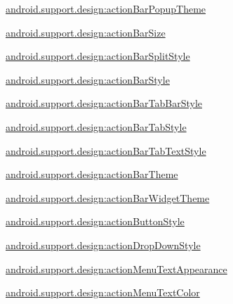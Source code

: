 {\ttfamily \hyperlink{classandroid_1_1support_1_1design_1_1R_1_1styleable_abe6573d781c288c0c9046d1b364bc010}{android.\+support.\+design\+:action\+Bar\+Popup\+Theme}}

{\ttfamily \hyperlink{classandroid_1_1support_1_1design_1_1R_1_1styleable_aa3e26576191105ff3f5ba8a1d92c188f}{android.\+support.\+design\+:action\+Bar\+Size}}

{\ttfamily \hyperlink{classandroid_1_1support_1_1design_1_1R_1_1styleable_a1bb68b5f66ea4a588bc4527379e17f79}{android.\+support.\+design\+:action\+Bar\+Split\+Style}}

{\ttfamily \hyperlink{classandroid_1_1support_1_1design_1_1R_1_1styleable_a762be5b610718b70a3cf442d4599d870}{android.\+support.\+design\+:action\+Bar\+Style}}

{\ttfamily \hyperlink{classandroid_1_1support_1_1design_1_1R_1_1styleable_ab0c563d507ebb2630a4566f31cf6f123}{android.\+support.\+design\+:action\+Bar\+Tab\+Bar\+Style}}

{\ttfamily \hyperlink{classandroid_1_1support_1_1design_1_1R_1_1styleable_a1347569d26ea3874ad7e4895dd851764}{android.\+support.\+design\+:action\+Bar\+Tab\+Style}}

{\ttfamily \hyperlink{classandroid_1_1support_1_1design_1_1R_1_1styleable_afd214b041105e6d734d0bcb07952db44}{android.\+support.\+design\+:action\+Bar\+Tab\+Text\+Style}}

{\ttfamily \hyperlink{classandroid_1_1support_1_1design_1_1R_1_1styleable_a546d385fc73621e6d2b4a7651393cf97}{android.\+support.\+design\+:action\+Bar\+Theme}}

{\ttfamily \hyperlink{classandroid_1_1support_1_1design_1_1R_1_1styleable_aa29dc2ceab71fce65a98112d59814cc4}{android.\+support.\+design\+:action\+Bar\+Widget\+Theme}}

{\ttfamily \hyperlink{classandroid_1_1support_1_1design_1_1R_1_1styleable_a7624e37d8aabda6278719ae78bd6ceac}{android.\+support.\+design\+:action\+Button\+Style}}

{\ttfamily \hyperlink{classandroid_1_1support_1_1design_1_1R_1_1styleable_a957bedc8ddafbc2bad20cfbde1be90c8}{android.\+support.\+design\+:action\+Drop\+Down\+Style}}

{\ttfamily \hyperlink{classandroid_1_1support_1_1design_1_1R_1_1styleable_a79a449d47565fce4e42e3450e3f6a326}{android.\+support.\+design\+:action\+Menu\+Text\+Appearance}}

{\ttfamily \hyperlink{classandroid_1_1support_1_1design_1_1R_1_1styleable_a156db0d0e55cd2febf73892e2d0e20ad}{android.\+support.\+design\+:action\+Menu\+Text\+Color}}

